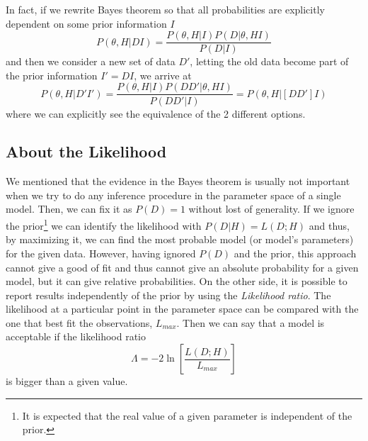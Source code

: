 \documentclass[onecolumn,           %
               showpacs,            %
               preprintnumbers,     %
               aps,                 %
               prl,          	    %
               letterpaper,             %
               superscriptaddress,      %
               nofootinbib,         %
               tightenlines,        %
               floats,floatfix      %
               ,usenatbib,
               ]{revtex4-1}
\begin{document}
In fact, if we rewrite Bayes theorem so that all probabilities are explicitly dependent on some prior information $I$
\begin{equation}\label{BayesTI}
P(\theta,H|DI)=\frac{P(\theta,H|I)P(D|\theta,HI)}{P(D|I)}
\end{equation}
and then we consider a new set of data $D'$, letting the old data become part of the prior information $I'=DI$, we arrive at \cite{AlanH}   
\begin{equation}
P(\theta,H|D'I')=\frac{P(\theta,H|I)P(DD'|\theta,HI)}{P(DD'|I)}=P(\theta,H|[DD']I)
\end{equation}
where we can explicitly see the equivalence of the 2 different options. 
\subsection{About the Likelihood}

We mentioned that the evidence in the Bayes theorem is usually not important when we try to do any inference procedure in the parameter space of a single model. Then, we can fix it as $P(D)=1$ without lost of generality. If we ignore the prior\footnote{It is expected that the real value of a given parameter is independent of the prior.} we can identify the likelihood with $P(D|H)=L(D;H)$ and thus, by maximizing it, we can find the most probable model (or model's parameters) for the given data. However, having ignored $P(D)$ and the prior, this approach cannot give a good of fit and thus cannot give an absolute probability for a given model, but it can give relative probabilities. On the other side, it is possible to report results independently of the prior by using the \textit{Likelihood ratio}. The likelihood at a particular point in the parameter space can be compared with the one that best fit the observations, $L_{max}$. Then we can say that a model is acceptable if the likelihood ratio
\begin{equation}
\Lambda=-2\ln\left[\frac{L(D;H)}{L_{max}}\right]
\end{equation}
is bigger than a given value.
\end{document}
